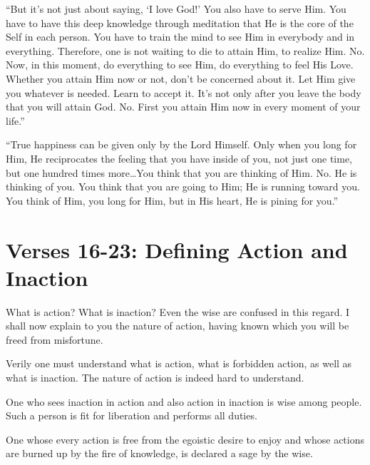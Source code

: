 \enquote{But it’s not just about saying, \enquote{I love God!} You also have to serve Him. You have to have this deep knowledge through meditation that He is the core of the Self in each person. You have to train the mind to see Him in everybody and in everything. Therefore, one is not waiting to die to attain Him, to realize Him. No. Now, in this moment, do everything to see Him, do everything to feel His Love. Whether you attain Him now or not, don’t be concerned about it. Let Him give you whatever is needed. Learn to accept it. It’s not only after you leave the body that you will attain God. No. First you attain Him now in every moment of your life.}


\enquote{True happiness can be given only by the Lord Himself. Only when you long for Him, He reciprocates the feeling that you have inside of you, not just one time, but one hundred times more\ldots You think that you are thinking of Him. No. He is thinking of you. You think that you are going to Him; He is running toward you. You think of Him, you long for Him, but in His heart, He is pining for you.}

\section{Verses 16-23: Defining Action and Inaction}\label{sec-verses-16-23-defining-action-and-inaction}
{What is action? What is inaction? Even the wise are confused in this regard. I shall now explain to you the nature of action, having known which you will be freed from misfortune.}

{Verily one must understand what is action, what is forbidden action, as well as what is inaction. The nature of action is indeed hard to understand.}

{One who sees inaction in action and also action in inaction is wise among people. Such a person is fit for liberation and performs all duties.}

{One whose every action is free from the egoistic desire to enjoy and whose actions are burned up by the fire of knowledge, is declared a sage by the wise.}

